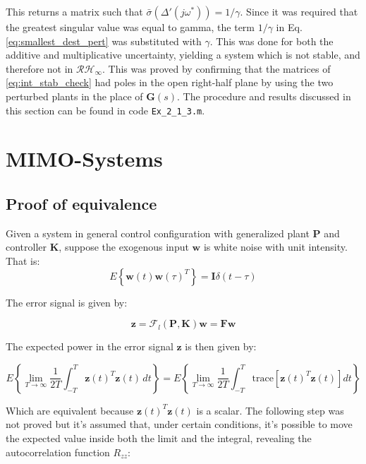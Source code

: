 \documentclass{scrreprt}
\begin{document}
This returns a matrix such that  $\bar{\sigma}(\Delta'(j\omega^*)) = 1/\gamma$. Since it was required that the greatest singular value was equal to gamma, the term $1/\gamma$ in Eq. \ref{eq:smallest_dest_pert} was substituted with $\gamma$. This was done for both the additive and multiplicative uncertainty, yielding a system which is not stable, and therefore not in $\mathcal{RH}_{\infty}$. This was proved by confirming that the matrices of \ref{eq:int_stab_check} had poles in the open right-half plane by using the two perturbed plants in the place of $\boldsymbol{G}(s)$. The procedure and results discussed in this section can be found in code \texttt{Ex\_2\_1\_3.m}.



\chapter{MIMO-Systems}

\section{Proof of equivalence}
Given a system in general control configuration with generalized plant $\boldsymbol{P}$ and controller $\boldsymbol{K}$, suppose the exogenous input $\boldsymbol{w}$ is white noise with unit intensity. That is:
\begin{equation}
    E \left \{\boldsymbol{w}(t)\boldsymbol{w}(\tau)^T \right\} =\boldsymbol{I}\delta (t-\tau)
    \label{eq:exp_w}
\end{equation}

The error signal is given by:

\begin{equation}
    \boldsymbol{z} = \mathcal{F}_l(\boldsymbol{P},\boldsymbol{K})\boldsymbol{w}=\boldsymbol{F}\boldsymbol{w}
\end{equation}

The expected power in the error signal $\boldsymbol{z}$ is then given by:

\begin{equation}
    E\left\{ \lim_{T\rightarrow \infty} \frac{1}{2T} \int_{-T}^{T} \boldsymbol{z}(t)^T\boldsymbol{z}(t) \, dt \right\} = E\left\{ \lim_{T\rightarrow \infty} \frac{1}{2T} \int_{-T}^{T} \text{trace}\left [\boldsymbol{z}(t)^T\boldsymbol{z}(t)\right] dt \right\}
\end{equation}

Which are equivalent because $\boldsymbol{z}(t)^T\boldsymbol{z}(t)$ is a scalar. The following step was not proved but it's assumed that, under certain conditions, it's possible to move the expected value inside both the limit and the integral, revealing the autocorrelation function $R_{zz}$:
\end{document}
